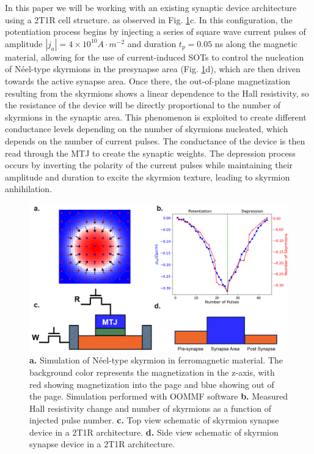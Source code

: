 \documentclass[conference]{IEEEtran}
\begin{document}
In this paper we will be working with an existing synaptic device architecture \cite{song_skyrmion-based_2020} using a 2T1R cell structure. as observed in Fig. \ref{fig:skyrmion}c. In this configuration, the potentiation process begins by injecting a series of square wave current pulses of amplitude $|j_a| = 4 \times 10^{10} A\cdot m^{-2}$ and duration $t_p = 0.05$ ns along the magnetic material, allowing for the use of current-induced SOTs to control the nucleation of Néel-type skyrmions in the presynapse area (Fig. \ref{fig:skyrmion}d), which are then driven towards the active synapse area. Once there, the out-of-plane magnetization resulting from the skyrmions shows a linear dependence to the Hall resistivity, so the resistance of the device will be directly proportional to the number of skyrmions in the synaptic area. This phenomenon is exploited to create different conductance levels depending on the number of skyrmions nucleated, which depends on the number of current pulses. The conductance of the device is then read through the MTJ to create the synaptic weights. The depression process occurs by inverting the polarity of the current pulses while maintaining their amplitude and duration to excite the skyrmion texture, leading to skyrmion anhihilation.
\begin{figure}[hbt!]
    \centering
    \includegraphics[width=0.9\linewidth]{Screenshot 2024-12-12 150053.png}
    \caption{\textbf{a.} Simulation of Néel-type skyrmion in ferromagnetic material. The background color represents the magnetization in the z-axis, with red showing magnetization into the page and blue showing out of the page. Simulation performed with OOMMF software \cite{donahue_m_j_oommf_1999} \textbf{b.} Measured Hall resistivity change and number of skyrmions as a function of injected pulse number. \textbf{c.} Top view schematic of skyrmion synapse device in a 2T1R architecture. \textbf{d.} Side view schematic of skyrmion synapse device in a 2T1R architecture.}
    \label{fig:skyrmion}
\end{figure}
\end{document}

